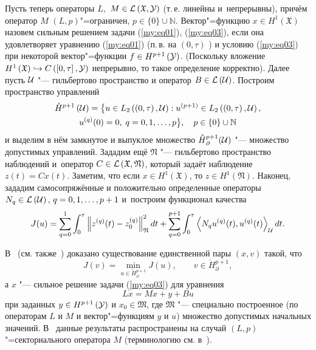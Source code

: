 Пусть теперь операторы $L,$ $M \in {\cal L} \left( {\mathfrak X}, {\cal Y}\right)$ (т.\,е. линейны и~непрерывны),
причём оператор $M$ $(L,p)$"=ограничен, $p\in\{0\}\cup{\mathbb N}$. 
Вектор"=функцию
$x\in H^{1} \left({\mathfrak X}\right)$ назовем сильным решением задачи (\ref{my:eq01}), (\ref{my:eq03}), если она удовлетворяет уравнению (\ref{my:eq01})
(п.\,в. на $(0, \tau)$ ) и условию (\ref{my:eq03}) при некоторой вектор"=функции $f\in H^{p+1}\left({\cal Y}\right)$. (Поскольку вложение $H^{1} \left({\mathfrak X}\right)\hookrightarrow C \left(\left[0,\tau\right],{\cal Y}\right)$ непрерывно,
то такое определение корректно). 
Далее пусть ${\cal U}$ "--- гильбертово пространство и оператор $B\in{\cal L}\left( {\cal U} \right)$.
Построим пространство управлений
\begin{multline*}
\mathring{H}{}^{p+1}\left({\cal U}\right)=\bigl\{u\in L_{2}\left(\left(0,\tau\right),{\cal U}\right):
u^{(p+1)}\in L_{2}\left(\left(0,\tau\right),{\cal U}\right),
\\
u^{(q)}(0)=0,\; q=0, 1, \dots, p \bigr\},\quad p\in\{0\}\cup{\mathbb N}
\end{multline*}
и выделим в нём замкнутое и выпуклое множество $\mathring{H}{}^{p+1}_{\partial}({\cal U})$ "--- множество
допустимых управлений. 
Зададим ещё ${\mathfrak N}$ "--- гильбертово пространство наблюдений и~оператор
$C\in{\cal L}\left({\mathfrak X}, {\mathfrak N}\right)$, который задаёт наблюдение $z(t)=Cx(t)$. 
Заметим, что если
$x\in H^{1}\left({\mathfrak X}\right)$, то $z\in H^{1}\left({\mathfrak N}\right)$. 
Наконец, зададим самосопряжённые
и положительно определенные операторы $N_{q}\in{\cal L}\left({\cal U}\right), \, q=0, 1, \dots, p+1 $ и~построим
функционал качества
\begin{equation*}
J(u)=\sum\limits^{1}_{q=0} \int^{\tau}_{0} \left\|z^{(q)}(t) - z^{(q)}_{0}\right\|^{2}_{{\mathfrak N}} dt +
\sum\limits^{p+1}_{q=0} \int^{\tau}_{0} \left\langle N_{q} u^{(q)}(t), u^{(q)}(t)\right\rangle_{{\cal U}} dt.
\end{equation*}


В~\cite{svef} (см. также~\cite[гл.~7]{SvirFed}) доказано существование единственной пары $(x,v)$ такой, что
\begin{equation}
\label{my:eq07}
J(v)=\min\limits_{u\in\mathring{H}{}^{p+1}_{\partial}} J(u),
 \qquad v\in\mathring{H}{}^{p+1}_{\partial},
\end{equation}
а $x$ "--- сильное решение задачи (\ref{my:eq03}) для уравнения
\begin{equation}
\label{my:eq08}
L\dot x=Mx+y+Bu
\end{equation}
при заданных  $y\in H^{p+1} \left( {\cal Y} \right)$ и $x_{0} \in {\mathfrak M}$, где
${\mathfrak M}$ "--- специально построенное (по операторам $L$ и $M$ и вектор"=функциям $y$ и $u$) множество
 допустимых начальных значений. В~\cite{svefD} данные результаты распространены на случай $(L,p)$"=секториального оператора
 $M$ (терминологию см. в~\cite[гл.~3]{SvirFed}).



